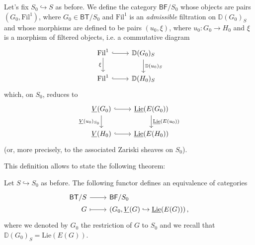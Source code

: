 \begin{defn}[]
	Let's fix $S_0 \hookrightarrow S$ as before.
	We define the category $\mathsf{BF}/S_0$ whose objects
	are pairs $(G_0, \mathrm{Fil}^1)$, where $G_0 \in \mathsf{BT}/S_0$
	and $\mathrm{Fil}^1$ is an {\em admissible} filtration on
	$\mathbb{D}(G_0)_S$ and whose morphisms are defined to be
	pairs $(u_0, \xi)$, where $u_0\colon G_0 \to H_0$
	and $\xi$ is a morphism of filtered objects, i.e. a commutative diagram
	\begin{equation*}
	\begin{tikzcd}
		\mathrm{Fil}^1 \arrow[d, "\xi"', rightarrow] 
		\arrow[r, "", hookrightarrow] &
		\mathbb{D}(G_0)_S 
		\arrow[d, "\mathbb{D}(u_0)_S", rightarrow] \\
		\mathrm{Fil}^1 \arrow[r, "", hookrightarrow] &
		\mathbb{D}(H_0)_S
	\end{tikzcd}
	\end{equation*}
	which, on $S_0$, reduces to
	\begin{equation*}
	\begin{tikzcd}
		\underline{V}(G_0) \arrow[r, "", hookrightarrow] 
		\arrow[d, "\underline{V}(u_0)_{S_0}"', rightarrow] &
		\underline{\mathrm{Lie}}(E(G_0))
		\arrow[d, "\underline{\mathrm{Lie}}(E(u_0))", rightarrow] \\
		\underline{V}(H_0) \arrow[r, "", hookrightarrow] &
		\underline{\mathrm{Lie}}(E(H_0))
	\end{tikzcd}
	\end{equation*}
	(or, more precisely, to the associated Zariski sheaves on $S_0$).
\end{defn}


\noindent
This definition allows to state the following theorem:
\begin{thm}\label{thm:EquivCatBTS}
	Let $S \hookrightarrow S_0$ as before.
	The following functor defines an equivalence of categories
	\begin{equation*}
	\begin{tikzcd}[row sep = 0ex
		,/tikz/column 1/.append style={anchor=base east}
		,/tikz/column 2/.append style={anchor=base west}]
		\mathsf{BT}/S \arrow[r, "", rightarrow] &
		\mathsf{BF}/S_0 \\
		G \arrow[r, "", mapsto] & 
		\left(G_0, \underline{V}(G) \hookrightarrow \underline{\mathrm{Lie}}(E(G))\right)
	,\end{tikzcd}
	\end{equation*} 
	where we denoted by $G_0$ the restriction of $G$ to $S_0$
	and we recall that $\mathbb{D}(G_0)_S = \mathrm{Lie}(E(G))$.
\end{thm}


